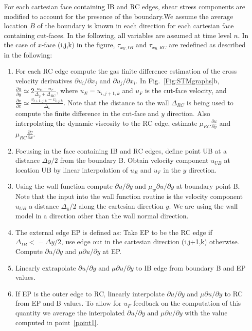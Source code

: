 For each cartesian face containing IB and RC edges, shear stress components are modified to account for the presence of the boundary.We assume the average location $B$ of the boundary is known in each direction for each cartesian face containing cut-faces. In the following, all variables are assumed at time level $n$. In the case of $x$-face (i,j,k) in the figure, $\tau_{xy,IB}$ and $\tau_{xy,RC}$ are redefined as described in the following:
%
\begin{enumerate}
    \item For each RC edge compute the gas finite difference estimation of the cross velocity derivatives $\partial u_i/\partial x_j$ and $\partial u_j/\partial x_i$. In Fig.~\ref{Fig:STMgraphs}b, $\frac{\partial u}{\partial y} \simeq 2 \frac{u_E-u_F}{\Delta_y + \Delta_{RC}}$, where $u_E=u_{i,j+1,k}$ and $u_F$ is the cut-face velocity, and $\frac{\partial v}{\partial x} \simeq \frac{v_{i+1,j,k}-v_{i,j,k}}{\Delta_x}$. Note that the distance to the wall $\Delta_{RC}$ is being used to compute the finite difference in the cut-face and $y$ direction. Also interpolating the dynamic viscosity to the RC edge, estimate $\mu_{RC} \frac{\partial u}{\partial y}$ and $\mu_{RC} \frac{\partial v}{\partial x}$. \label{point1}
     \item Focusing in the face containing IB and RC edges, define point UB at a distance $\Delta y/2$ from the boundary B. Obtain velocity component $u_{UB}$ at location UB by linear interpolation of $u_E$ and $u_F$ in the $y$ direction.
     \item Using the wall function compute $\partial u/\partial y$ and $\mu_w \partial u/\partial y$ at boundary point B. Note that the input into the wall function routine is the velocity component $u_{UB}$ a distance $\Delta_y/2$ along the cartesian direction $y$. We are using the wall model in a direction other than the wall normal direction. 
     \item The external edge EP is defined as: Take EP to be the RC edge if $\Delta_{IB} <= \Delta y/2$, use edge out in the cartesian direction (i,j+1,k) otherwise. Compute $\partial u/\partial y$ and $\mu \partial u/\partial y$ at EP.
     \item Linearly extrapolate $\partial u/\partial y$ and $\mu \partial u/\partial y$ to IB edge from boundary B and EP values.
     \item If EP is the outer edge to RC, linearly interpolate $\partial u/\partial y$ and $\mu \partial u/\partial y$ to RC from EP and B values. To allow for $u_F$ feedback on the computation of this quantity we average the interpolated $\partial u/\partial y$ and $\mu \partial u/\partial y$ with the value computed in point~\ref{point1}.
\end{enumerate}
%

